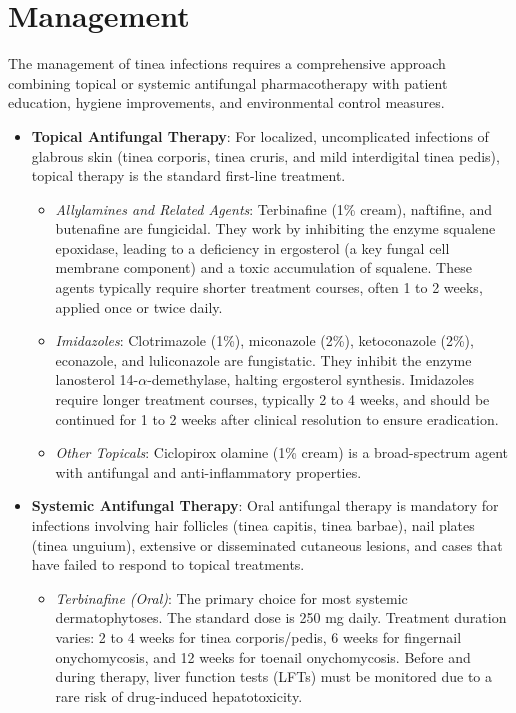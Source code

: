 \section*{Management}
The management of tinea infections requires a comprehensive approach combining topical or systemic antifungal pharmacotherapy with patient education, hygiene improvements, and environmental control measures.
\begin{itemize}
    \item \textbf{Topical Antifungal Therapy}: For localized, uncomplicated infections of glabrous skin (tinea corporis, tinea cruris, and mild interdigital tinea pedis), topical therapy is the standard first-line treatment.
        \begin{itemize}
            \item \textit{Allylamines and Related Agents}: Terbinafine (1\% cream), naftifine, and butenafine are fungicidal. They work by inhibiting the enzyme squalene epoxidase, leading to a deficiency in ergosterol (a key fungal cell membrane component) and a toxic accumulation of squalene. These agents typically require shorter treatment courses, often 1 to 2 weeks, applied once or twice daily.
            \item \textit{Imidazoles}: Clotrimazole (1\%), miconazole (2\%), ketoconazole (2\%), econazole, and luliconazole are fungistatic. They inhibit the enzyme lanosterol 14-$\alpha$-demethylase, halting ergosterol synthesis. Imidazoles require longer treatment courses, typically 2 to 4 weeks, and should be continued for 1 to 2 weeks after clinical resolution to ensure eradication.
            \item \textit{Other Topicals}: Ciclopirox olamine (1\% cream) is a broad-spectrum agent with antifungal and anti-inflammatory properties.
        \end{itemize}
    \item \textbf{Systemic Antifungal Therapy}: Oral antifungal therapy is mandatory for infections involving hair follicles (tinea capitis, tinea barbae), nail plates (tinea unguium), extensive or disseminated cutaneous lesions, and cases that have failed to respond to topical treatments.
        \begin{itemize}
            \item \textit{Terbinafine (Oral)}: The primary choice for most systemic dermatophytoses. The standard dose is 250 mg daily. Treatment duration varies: 2 to 4 weeks for tinea corporis/pedis, 6 weeks for fingernail onychomycosis, and 12 weeks for toenail onychomycosis. Before and during therapy, liver function tests (LFTs) must be monitored due to a rare risk of drug-induced hepatotoxicity.

\end{itemize}
\end{itemize}
